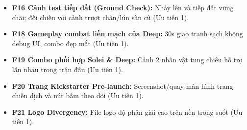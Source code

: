 \documentclass[11pt,a4paper]{article}
\newcommand{\tickbox}{\fbox{\rule{0pt}{0.75em}\hspace{0.75em}}}
\begin{document}
\begin{itemize}[label=\tickbox]
    \item \textbf{F16 Cảnh test tiếp đất (Ground Check):} Nhảy lên và tiếp đất vững chãi; đối chiếu với cảnh trượt chân/lún sàn cũ (Ưu tiên 1).
    \item \textbf{F18 Gameplay combat liền mạch của Deep:} 30s giao tranh sạch không debug UI, combo đẹp mắt (Ưu tiên 1).
    \item \textbf{F19 Combo phối hợp Solei \& Deep:} Cảnh 2 nhân vật tung chiêu hỗ trợ lẫn nhau trong trận đấu (Ưu tiên 1).
    \item \textbf{F20 Trang Kickstarter Pre-launch:} Screenshot/quay màn hình trang chiến dịch và nút bấm theo dõi (Ưu tiên 1).
    \item \textbf{F21 Logo Divergency:} File logo độ phân giải cao trên nền trong suốt (Ưu tiên 1).
\end{itemize}
\end{document}
